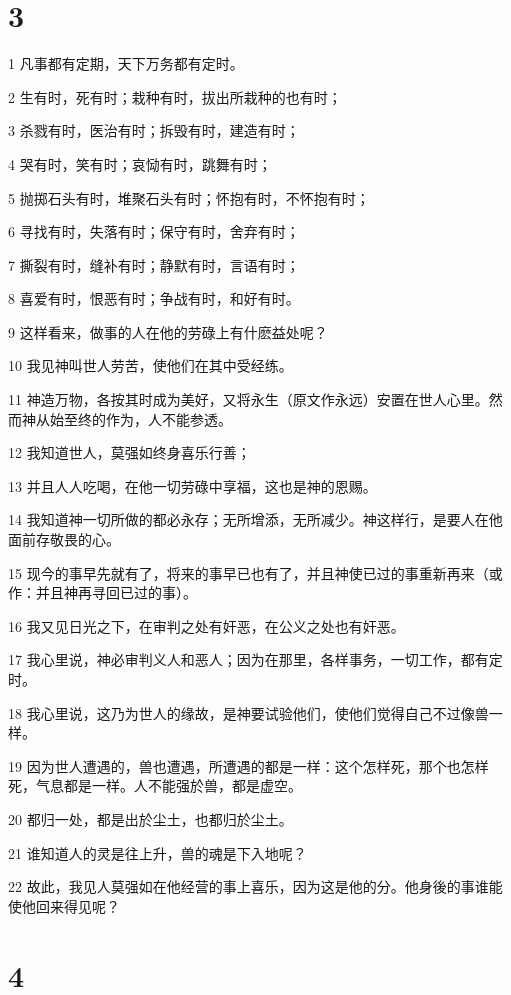 \chapter{3}

\par 1 凡事都有定期，天下万务都有定时。
\par 2 生有时，死有时；栽种有时，拔出所栽种的也有时；
\par 3 杀戮有时，医治有时；拆毁有时，建造有时；
\par 4 哭有时，笑有时；哀恸有时，跳舞有时；
\par 5 抛掷石头有时，堆聚石头有时；怀抱有时，不怀抱有时；
\par 6 寻找有时，失落有时；保守有时，舍弃有时；
\par 7 撕裂有时，缝补有时；静默有时，言语有时；
\par 8 喜爱有时，恨恶有时；争战有时，和好有时。
\par 9 这样看来，做事的人在他的劳碌上有什麽益处呢？
\par 10 我见神叫世人劳苦，使他们在其中受经练。
\par 11 神造万物，各按其时成为美好，又将永生（原文作永远）安置在世人心里。然而神从始至终的作为，人不能参透。
\par 12 我知道世人，莫强如终身喜乐行善；
\par 13 并且人人吃喝，在他一切劳碌中享福，这也是神的恩赐。
\par 14 我知道神一切所做的都必永存；无所增添，无所减少。神这样行，是要人在他面前存敬畏的心。
\par 15 现今的事早先就有了，将来的事早已也有了，并且神使已过的事重新再来（或作：并且神再寻回已过的事）。
\par 16 我又见日光之下，在审判之处有奸恶，在公义之处也有奸恶。
\par 17 我心里说，神必审判义人和恶人；因为在那里，各样事务，一切工作，都有定时。
\par 18 我心里说，这乃为世人的缘故，是神要试验他们，使他们觉得自己不过像兽一样。
\par 19 因为世人遭遇的，兽也遭遇，所遭遇的都是一样：这个怎样死，那个也怎样死，气息都是一样。人不能强於兽，都是虚空。
\par 20 都归一处，都是出於尘土，也都归於尘土。
\par 21 谁知道人的灵是往上升，兽的魂是下入地呢？
\par 22 故此，我见人莫强如在他经营的事上喜乐，因为这是他的分。他身後的事谁能使他回来得见呢？

\chapter{4}

